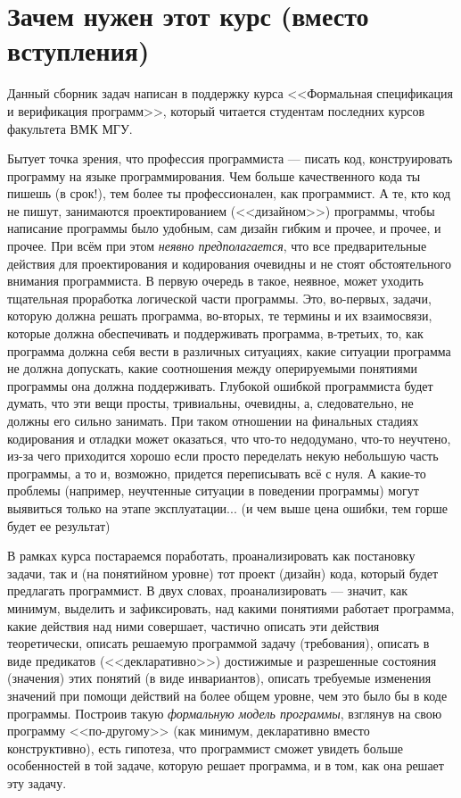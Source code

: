 \section*{Зачем нужен этот курс (вместо вступления)}

Данный сборник задач написан в поддержку курса <<Формальная спецификация и верификация программ>>, который читается студентам последних курсов факультета ВМК МГУ.

Бытует точка зрения, что профессия программиста --- писать код, конструировать программу на языке программирования. Чем больше качественного кода ты пишешь (в срок!), тем более ты профессионален, как программист. А те, кто код не пишут, занимаются проектированием (<<дизайном>>) программы, чтобы написание программы было удобным, сам дизайн гибким и прочее, и прочее, и прочее. При всём при этом \emph{неявно предполагается}, что все предварительные действия для проектирования и кодирования очевидны и не стоят обстоятельного внимания программиста. В первую очередь в такое, неявное, может уходить тщательная проработка логической части программы. Это, во-первых, задачи, которую должна решать программа, во-вторых, те термины и их взаимосвязи, которые должна обеспечивать и поддерживать программа, в-третьих, то, как программа должна себя вести в различных ситуациях, какие ситуации программа не должна допускать, какие соотношения между оперируемыми понятиями программы она должна поддерживать. Глубокой ошибкой программиста будет думать, что эти вещи просты, тривиальны, очевидны, а, следовательно, не должны его сильно занимать. При таком отношении на финальных стадиях кодирования и отладки может оказаться, что что-то недодумано, что-то неучтено, из-за чего приходится хорошо если просто переделать некую небольшую часть программы, а то и, возможно, придется переписывать всё с нуля. А какие-то проблемы (например, неучтенные ситуации в поведении программы) могут выявиться только на этапе эксплуатации... (и чем выше цена ошибки, тем горше будет ее результат)

В рамках курса постараемся поработать, проанализировать как постановку задачи, так и (на понятийном уровне) тот проект (дизайн) кода, который будет предлагать программист. В двух словах, проанализировать --- значит, как минимум, выделить и зафиксировать, над какими понятиями работает программа, какие действия над ними совершает, частично описать эти действия теоретически, описать решаемую программой задачу (требования), описать в виде предикатов (<<декларативно>>) достижимые и разрешенные состояния (значения) этих понятий (в виде инвариантов), описать требуемые изменения значений при помощи действий на более общем уровне, чем это было бы в коде программы. Построив такую \emph{формальную модель программы}, взглянув на свою программу <<по-другому>> (как минимум, декларативно вместо конструктивно), есть гипотеза, что программист сможет увидеть больше особенностей в той задаче, которую решает программа, и в том, как она решает эту задачу.

